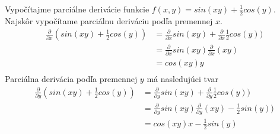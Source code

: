 \documentclass[../main.tex]{subfiles}
\begin{document}
Vypočítajme parciálne derivácie funkcie $f(x,y)= sin(xy)+\frac{1}{2}cos(y)$.\\
Najskôr vypočítame parciálnu deriváciu podľa premennej $x$.
\begin{equation}
	\begin{split}
	\frac{\partial}{\partial x}(sin(xy)+\frac{1}{2}cos(y)) &= \frac{\partial}{\partial x}sin(xy)+\frac{\partial}{\partial x}\frac{1}{2}cos(y)) \\
	&= \frac{\partial}{\partial x}sin(xy)\frac{\partial}{\partial x}(xy)\\
	&= cos(xy)y \\
	\end{split}
	\label{eqn:PDx2}
\end{equation}
Parciálna derivácia podľa premennej $y$ má nasledujúci tvar 
\begin{equation}
	\begin{split}
	\frac{\partial}{\partial y}(sin(xy)+\frac{1}{2}cos(y)) &= \frac{\partial}{\partial y}sin(xy)+\frac{\partial}{\partial y}\frac{1}{2}cos(y)) \\
	&= \frac{\partial}{\partial y}sin(xy)\frac{\partial}{\partial y}(xy)-\frac{1}{2}sin(y)) \\
	&= cos(xy)x - \frac{1}{2}sin(y) \\
	\end{split}
	\label{eqn:PDy2}
\end{equation}

		
\end{document}
